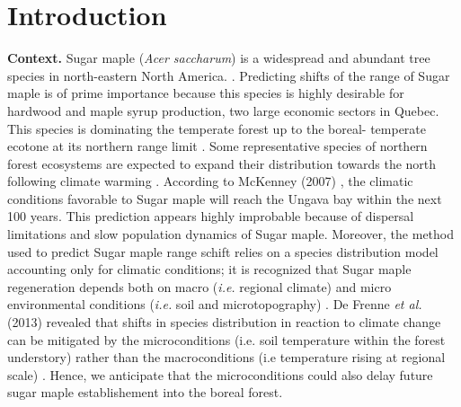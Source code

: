 


\newpage
\setcounter{page}{1}

\section{Introduction}

\textbf{Context.} Sugar maple (\textit{Acer saccharum}) is a widespread and
abundant tree species in north-eastern North America.
\cite{Graignic2013,Messaoud2007,Kellman2004,Barras1998}. Predicting shifts of
the range of Sugar maple is of prime importance because this species is highly
desirable for hardwood and maple syrup production, two large economic sectors
in Quebec. This species is dominating the temperate forest up to the boreal-
temperate ecotone at its northern range limit \cite{Barras1998}. Some
representative species of northern forest ecosystems are expected to expand
their distribution towards the north following climate warming
\cite{Sciences2014,Iverson2002}. According to McKenney (2007)
\cite{Sciences2014}, the climatic conditions  favorable to Sugar maple  will
reach the Ungava bay within the next 100 years. This prediction appears highly
improbable because of dispersal limitations and slow population dynamics of
Sugar maple. Moreover, the method used to predict Sugar maple range schift
relies on a species distribution model accounting only for climatic
conditions; it is recognized that Sugar maple regeneration depends both on
macro  (\textit{i.e.} regional climate) and micro environmental conditions
(\textit{i.e.} soil and microtopography) \cite{Graignic2013,Lafleur2010}. De
Frenne \textit{et al.} (2013) revealed that shifts in species distribution in
reaction to climate change can be mitigated by the microconditions (i.e. soil
temperature within the forest understory) rather than the macroconditions (i.e
temperature rising at regional scale) \cite{DeFrenne2013}. Hence, we
anticipate that the microconditions could also delay future sugar maple
establishement into the boreal forest.\\

